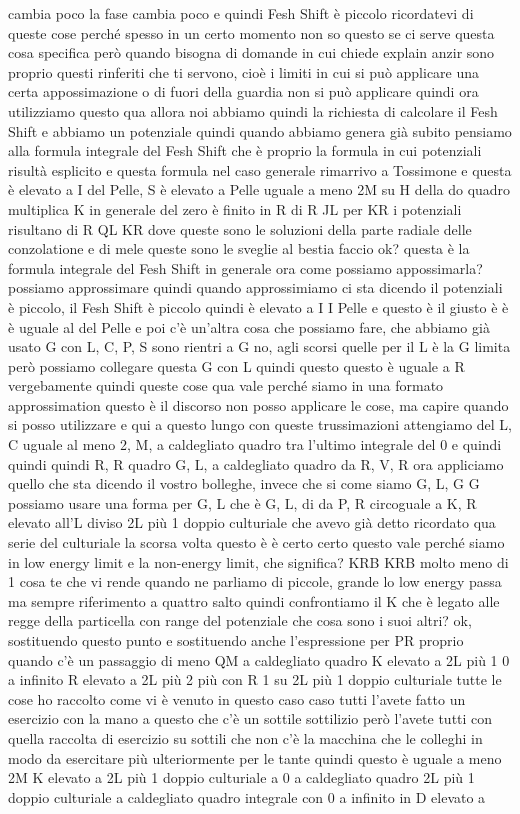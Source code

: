 \begin{soluzione}
   cambia poco la fase cambia poco e quindi Fesh Shift è piccolo ricordatevi di queste cose perché spesso in un certo momento non so questo se ci serve questa cosa specifica però quando bisogna di domande in cui chiede explain anzir sono proprio questi rinferiti che ti servono, cioè i limiti in cui si può applicare una certa appossimazione o di fuori della guardia non si può applicare quindi ora utilizziamo questo qua allora noi abbiamo quindi la richiesta di calcolare il Fesh Shift e abbiamo un potenziale quindi quando abbiamo genera già subito pensiamo alla formula integrale del Fesh Shift che è proprio la formula in cui potenziali risultà esplicito e questa formula nel caso generale rimarrivo a Tossimone e questa è elevato a I del Pelle, S è elevato a Pelle uguale a meno 2M su H della do quadro multiplica K in generale del zero è finito in R di R JL per KR i potenziali risultano di R QL KR dove queste sono le soluzioni della parte radiale delle conzolatione e di mele queste sono le sveglie al bestia faccio ok? questa è la formula integrale del Fesh Shift in generale ora come possiamo appossimarla? possiamo approssimare quindi quando approssimiamo ci sta dicendo il potenziali è piccolo, il Fesh Shift è piccolo quindi è elevato a I I Pelle e questo è il giusto è è è uguale al del Pelle e poi c'è un'altra cosa che possiamo fare, che abbiamo già usato G con L, C, P, S sono rientri a G no, agli scorsi quelle per il L è la G limita però possiamo collegare questa G con L quindi questo questo è uguale a R vergebamente quindi queste cose qua vale perché siamo in una formato approssimation questo è il discorso non posso applicare le cose, ma capire quando si posso utilizzare e qui a questo lungo con queste trussimazioni attengiamo del L, C uguale al meno 2, M, a caldegliato quadro tra l'ultimo integrale del 0 e quindi quindi quindi R, R quadro G, L, a caldegliato quadro da R, V, R ora appliciamo quello che sta dicendo il vostro bolleghe, invece che si come siamo G, L, G G possiamo usare una forma per G, L che è G, L, di da P, R circoguale a K, R elevato all'L diviso 2L più 1 doppio culturiale che avevo già detto ricordato qua serie del culturiale la scorsa volta questo è è certo certo questo vale perché siamo in low energy limit e la non-energy limit, che significa? KRB KRB molto meno di 1 cosa te che vi rende quando ne parliamo di piccole, grande lo low energy passa ma sempre riferimento a quattro salto quindi confrontiamo il K che è legato alle regge della particella con range del potenziale che cosa sono i suoi altri? ok, sostituendo questo punto e sostituendo anche l'espressione per PR proprio quando c'è un passaggio di meno QM a caldegliato quadro K elevato a 2L più 1 0 a infinito R elevato a 2L più 2 più con R 1 su 2L più 1 doppio culturiale tutte le cose ho raccolto come vi è venuto in questo caso caso tutti l'avete fatto un esercizio con la mano a questo che c'è un sottile sottilizio però l'avete tutti con quella raccolta di esercizio su sottili che non c'è la macchina che le colleghi in modo da esercitare più ulteriormente per le tante quindi questo è uguale a meno 2M K elevato a 2L più 1 doppio culturiale a 0 a caldegliato quadro 2L più 1 doppio culturiale a caldegliato quadro integrale con 0 a infinito in D elevato a 
   

\end{soluzione}
